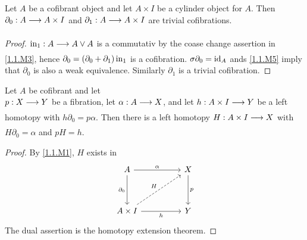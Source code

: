 \documentclass[../main]{subfiles}
\begin{document}
\begin{lemma}\label{lem:1.1.2}
	Let $A$ be a cofibrant object and let $A\times I$ be a cylinder object for $A$. Then \newline $\partial_0:A\varrightarrow{}A\times I$ and $\partial_1:A\varrightarrow{}A\times I$ are trivial cofibrations.
\end{lemma}

\begin{proof}
	$\In_1:A\varrightarrow{}A\vee A$ is a commutativ by the coase change assertion in \ref{1.1.M3}, hence $\partial_0=(\partial_0+\partial_1)\operatorname{in}_1$ is a cofibration. $\sigma \partial_0=\operatorname{id}_A$ ands \ref{1.1.M5} imply that $\partial_0$ is also a weak equivalence. Similarly $\partial_1$ is a trivial cofibration.	
\end{proof}

\begin{corollary*}\label{cor:1.1.1} 
	Let $A$ be cofibrant and let \\$p:X\varrightarrow{}Y$ be a fibration, let $\alpha:A\varrightarrow{}X$, and let $h:A\times I\varrightarrow{}Y$ be a left homotopy with $h\partial_0=p\alpha$. Then there is a left homotopy $H:A\times I\varrightarrow{} X$ with $H\partial_0=\alpha$ and $pH=h$.
\end{corollary*}

\begin{proof}
	By \ref{1.1.M1}, $H$ exists in
    \[\begin{tikzcd}
	A && X \\
	\\
	{A\times I} && Y
	\arrow["{\partial_0}"', from=1-1, to=3-1]
	\arrow["\alpha", from=1-1, to=1-3]
	\arrow["h"', from=3-1, to=3-3]
	\arrow["p", from=1-3, to=3-3]
	\arrow["H", dashed, from=3-1, to=1-3]
    \end{tikzcd}\]
	The dual assertion is the homotopy extension theorem.
\end{proof}
\end{document}
